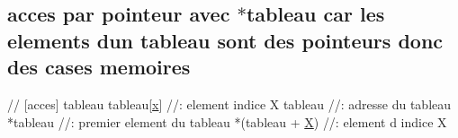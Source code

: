 \subsection*{acces par pointeur avec $\ast$tableau car les elements d\textquotesingle{}un tableau sont des pointeurs donc des cases memoires}


\begin{DoxyCode}
\textcolor{comment}{// [acces] tableau}
tableau[\hyperlink{addition_8c_a6150e0515f7202e2fb518f7206ed97dc}{x}] \textcolor{comment}{//: element indice X}
tableau \textcolor{comment}{//: adresse du tableau}
*tableau \textcolor{comment}{//: premier element du tableau}
*(tableau + \hyperlink{namespaceex__pipeline__with__param_a7de98dcd71f72619064ad930ed9ecf2e}{X}) \textcolor{comment}{//: element d indice X}
\end{DoxyCode}
 